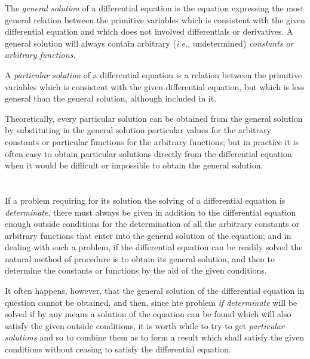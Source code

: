 \documentclass[oneside,12pt]{book}
\begin{document}
The \textit{general solution} of a differential equation is the equation expressing the most general relation between the primitive variables which is consistent with the given differential equation and which does not involved differentials or derivatives. A general solution will always contain arbitrary (\textit{i.e.}, undetermined) \textit{constants \emph{or} arbitrary functions.} \par 

A \textit{particular solution} of a differential equation is a relation between the primitive variables which is consistent with the given differential equation, but which is less general than the general solution, although included in it. \par 

Theoretically, every particular solution can be obtained from the general solution by substituting in the general solution particular values for the arbitrary constants or particular functions for the arbitrary functions; but in practice it is often easy to obtain particular solutions directly from the differential equation when it would be difficult or impossible to obtain the general solution. \par 

\section{} If a problem requiring for its solution the solving of a differential equation is \textit{determinate}, there must always be given in addition to the differential equation enough outside conditions for the determination of all the arbitrary constants or arbitrary functions that enter into the general solution of the equation; and in dealing with such a problem, if the differential equation can be readily solved the natural method of procedure is to obtain its general solution, and then to determine the constants or functions by the aid of the given conditions. \par 

It often happens, however, that the general solution of the differential equation in question cannot be obtained, and then, since hte problem \textit{if determinate} will be solved if by any means a solution of the equation can be found which will also satisfy the given outside conditions, it is worth while to try to get \textit{particular solutions} and so to combine them as to form a result which shall satisfy the given conditions without ceasing to satisfy the differential equation. \par 
\end{document}
